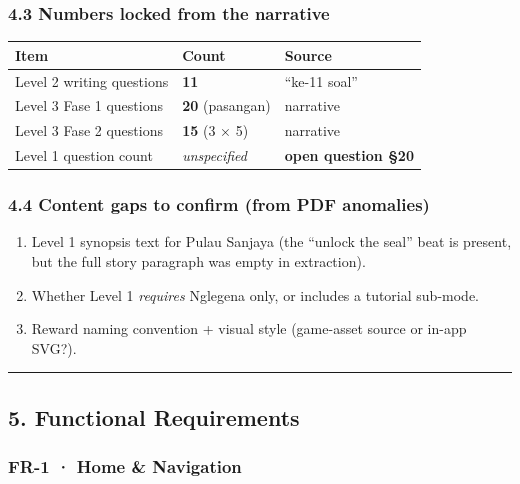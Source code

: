 \documentclass[
  11pt,
]{article}
\providecommand{\tightlist}{%
  \setlength{\itemsep}{0pt}\setlength{\parskip}{0pt}}
\begin{document}
\subsubsection{4.3 Numbers locked from the
narrative}\label{numbers-locked-from-the-narrative}

\begin{longtable}[]{@{}lll@{}}
\toprule\noalign{}
Item & Count & Source \\
\midrule\noalign{}
\endhead
\bottomrule\noalign{}
\endlastfoot
Level 2 writing questions & \textbf{11} & ``ke-11 soal'' \\
Level 3 Fase 1 questions & \textbf{20} (pasangan) & narrative \\
Level 3 Fase 2 questions & \textbf{15} (3 × 5) & narrative \\
Level 1 question count & \emph{unspecified} & \textbf{open question
§20} \\
\end{longtable}

\subsubsection{4.4 Content gaps to confirm (from PDF
anomalies)}\label{content-gaps-to-confirm-from-pdf-anomalies}

\begin{enumerate}
\def\labelenumi{\arabic{enumi}.}
\tightlist
\item
  Level 1 synopsis text for Pulau Sanjaya (the ``unlock the seal'' beat
  is present, but the full story paragraph was empty in extraction).
\item
  Whether Level 1 \emph{requires} Nglegena only, or includes a tutorial
  sub-mode.
\item
  Reward naming convention + visual style (game-asset source or in-app
  SVG?).
\end{enumerate}

\begin{center}\rule{0.5\linewidth}{0.5pt}\end{center}

\subsection{5. Functional Requirements}\label{functional-requirements}

\subsubsection{FR-1 · Home \& Navigation}\label{fr-1-home-navigation}
\end{document}
